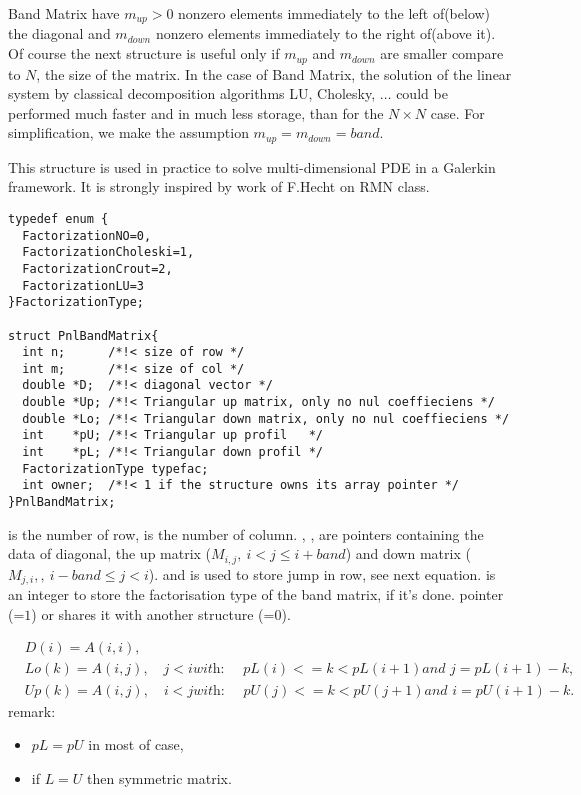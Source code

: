 Band Matrix have $m_{up}>0$ nonzero elements immediately to the left of(below)
the diagonal and $m_{down}$ nonzero elements immediately to the right of(above
it). Of course the next structure is useful only if $m_{up}$ and $m_{down}$
are smaller compare to $N$, the size of the matrix. In the case of Band
Matrix, the solution of the linear system by classical decomposition algorithms
LU, Cholesky, $\dots$ could be performed much faster and in much less storage, 
than for the $N\times N $ case. For simplification, we make the assumption $m_{up}=m_{down}=band$.


This structure is used in practice to solve multi-dimensional PDE in a Galerkin
framework. It is strongly inspired by work of F.Hecht on RMN class. 


\begin{verbatim}
typedef enum {
  FactorizationNO=0, 
  FactorizationCholeski=1, 
  FactorizationCrout=2, 
  FactorizationLU=3
}FactorizationType;

struct PnlBandMatrix{
  int n;      /*!< size of row */ 
  int m;      /*!< size of col */ 
  double *D;  /*!< diagonal vector */  
  double *Up; /*!< Triangular up matrix, only no nul coeffieciens */ 
  double *Lo; /*!< Triangular down matrix, only no nul coeffieciens */
  int    *pU; /*!< Triangular up profil   */ 
  int    *pL; /*!< Triangular down profil */
  FactorizationType typefac;
  int owner;  /*!< 1 if the structure owns its array pointer */
}PnlBandMatrix;
\end{verbatim}

 is the number of row,  is the number of column.
, ,   are pointers containing the
data of diagonal, the up matrix ($M_{i, j}, \ i<j\leq i+band$) and  down
matrix ($M_{j, i}, , \ i-band\leq j<i$).
 and  is used to store jump in row, see next equation.
 is an integer to store the factorisation type of the band
matrix, if it's done.
pointer (=$1$) or shares it with another structure (=$0$).


\begin{align*}
  \label{eq:1}
  & D(i) = A(i, i), \nonumber \\
  & Lo(k) = A(i, j), \quad j < i \textit{with: } \quad pL(i)<= k < pL(i+1)
  \textit{and } j = pL(i+1)-k, \\
  & Up(k) =A(i, j), \quad i < j \textit{with: } \quad pU(j)<= k < pU(j+1) \textit{and } i
  = pU(i+1)-k.\nonumber
\end{align*}
remark:
\begin{itemize}
\item $ pL = pU $ in most of case, 
\item if $L = U$ then symmetric matrix.
\end{itemize}


